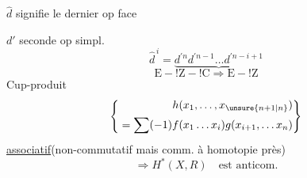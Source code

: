 $\widehat d$ signifie le dernier op face

$d'$ seconde op simpl.
\[
\widehat d^{\,i}=\underbrace{d^{\prime n}d^{\prime n-1}\ldots d^{\prime n-i+1}}
\]
\[
\mathrm{E\!-!Z\!-!C}\Rightarrow\mathrm{E\!-!Z}
\]
Cup-produit
\[
\left\{\begin{aligned}
h(x_1,\ldots,x_{\unsure{n+1|n}})\\
{}=\sum(-1)f(x_1\ldots x_i)g(x_{i+1},\ldots x_n)
\end{aligned}\right\}
\]
\uline{associatif}\quad(non-commutatif mais comm. à homotopie près)
\[
\Rightarrow H^*(X,R)\quad\text{est anticom.}
\]
